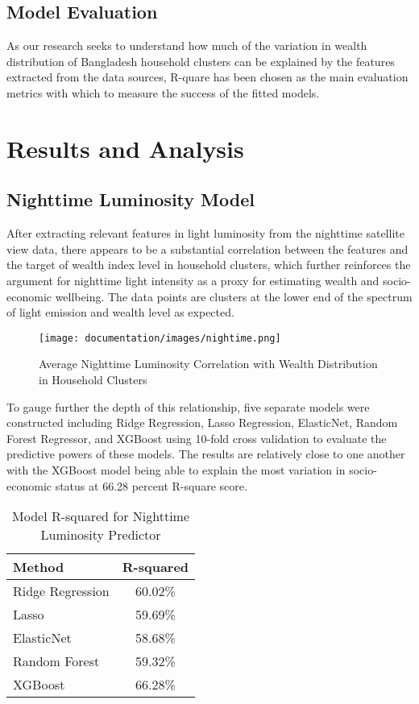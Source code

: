 \documentclass[solid,math,chem,code,plot,gloss]{bmc}
\begin{document}
\section{Model Evaluation}

As our research seeks to understand how much of the variation in wealth distribution of Bangladesh household clusters can be explained by the features extracted from the data sources, R-quare has been chosen as the main evaluation metrics with which to measure the success of the fitted models. 

\chapter{Results and Analysis}

\section{Nighttime Luminosity Model}

After extracting relevant features in light luminosity from the nighttime satellite view data, there appears to be a substantial correlation between the features and the target of wealth index level in household clusters, which further reinforces the argument for nighttime light intensity as a proxy for estimating wealth and socio-economic wellbeing. The data points are clusters at the lower end of the spectrum of light emission and wealth level as expected. 

\begin{figure}[hbt!]
    \centering
    \texttt{[image: documentation/images/nightime.png]}
    \caption{Average Nighttime Luminosity Correlation with Wealth Distribution in Household Clusters}
    \label{fig:AfD}
\end{figure}

To gauge further the depth of this relationship, five separate models were constructed including Ridge Regression, Lasso Regression, ElasticNet,  Random Forest Regressor, and XGBoost using 10-fold cross validation to evaluate the predictive powers of these models. The results are relatively close to one another with the XGBoost model being able to explain the most variation in socio-economic status at 66.28 percent R-square score. 

\begin{table}[hbt!]
\begin{center}
\begin{tabular}{|l|c|}
\hline
Method & R-squared \\
\hline\hline\hline
Ridge Regression & 60.02\% \\
Lasso & 59.69\% \\
ElasticNet & 58.68\% \\
Random Forest & 59.32\% \\
XGBoost & 66.28\% \\

\hline
\end{tabular}
\end{center}
\label{tab:RMSEs}
\caption{Model R-squared for Nighttime Luminosity Predictor}
\end{table}
\end{document}
